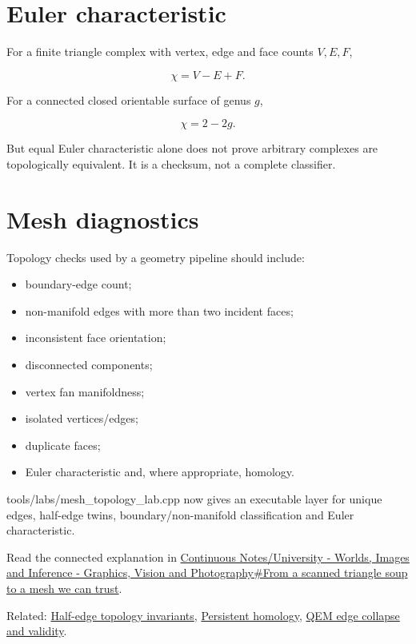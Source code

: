 \section{Euler characteristic}\label{appendix-e38976cbbf86-euler-characteristic}

For a finite triangle complex with vertex, edge and face counts \(V,E,F\),

\[
\chi=V-E+F.
\]

For a connected closed orientable surface of genus \(g\),

\[
\chi=2-2g.
\]

But equal Euler characteristic alone does not prove arbitrary complexes are topologically equivalent. It is a checksum, not a complete classifier.

\section{Mesh diagnostics}\label{appendix-e38976cbbf86-mesh-diagnostics}

Topology checks used by a geometry pipeline should include:

\begin{itemize}
\tightlist
\item
  boundary-edge count;
\item
  non-manifold edges with more than two incident faces;
\item
  inconsistent face orientation;
\item
  disconnected components;
\item
  vertex fan manifoldness;
\item
  isolated vertices/edges;
\item
  duplicate faces;
\item
  Euler characteristic and, where appropriate, homology.
\end{itemize}

tools/labs/mesh\_topology\_lab.cpp now gives an executable layer for unique edges, half-edge twins, boundary/non-manifold classification and Euler characteristic.

Read the connected explanation in \href{Continuous\%20Notes/University\%20-\%20Worlds,\%20Images\%20and\%20Inference\%20-\%20Graphics,\%20Vision\%20and\%20Photography\#From\%20a\%20scanned\%20triangle\%20soup\%20to\%20a\%20mesh\%20we\%20can\%20trust}{Continuous Notes/University - Worlds, Images and Inference - Graphics, Vision and Photography\#From a scanned triangle soup to a mesh we can trust}.

Related: \hyperref[appendix-faac749c9cdd]{Half-edge topology invariants}, \hyperref[appendix-e4d8ed8d6787]{Persistent homology}, \hyperref[appendix-89db9fe1bc8a]{QEM edge collapse and validity}.
